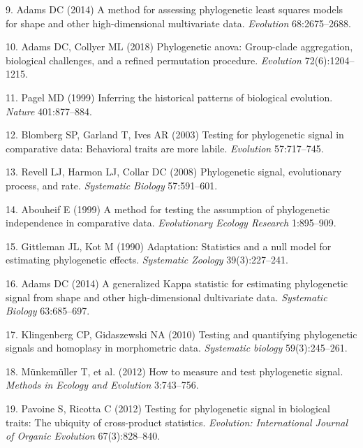 \documentclass[9pt,twocolumn,twoside,lineno]{pnas-new}
\begin{document}
\leavevmode\hypertarget{ref-Adams2014b}{}%
9. Adams DC (2014) A method for assessing phylogenetic least squares
models for shape and other high-dimensional multivariate data.
\emph{Evolution} 68:2675--2688.

\leavevmode\hypertarget{ref-AdamsCollyer2018b}{}%
10. Adams DC, Collyer ML (2018) Phylogenetic anova: Group-clade
aggregation, biological challenges, and a refined permutation procedure.
\emph{Evolution} 72(6):1204--1215.

\leavevmode\hypertarget{ref-Pagel1999}{}%
11. Pagel MD (1999) Inferring the historical patterns of biological
evolution. \emph{Nature} 401:877--884.

\leavevmode\hypertarget{ref-Blomberg_et_al2003}{}%
12. Blomberg SP, Garland T, Ives AR (2003) Testing for phylogenetic
signal in comparative data: Behavioral traits are more labile.
\emph{Evolution} 57:717--745.

\leavevmode\hypertarget{ref-Revell_et_al2008}{}%
13. Revell LJ, Harmon LJ, Collar DC (2008) Phylogenetic signal,
evolutionary process, and rate. \emph{Systematic Biology} 57:591--601.

\leavevmode\hypertarget{ref-Abouheif1999}{}%
14. Abouheif E (1999) A method for testing the assumption of
phylogenetic independence in comparative data. \emph{Evolutionary
Ecology Research} 1:895--909.

\leavevmode\hypertarget{ref-Gittleman1990}{}%
15. Gittleman JL, Kot M (1990) Adaptation: Statistics and a null model
for estimating phylogenetic effects. \emph{Systematic Zoology}
39(3):227--241.

\leavevmode\hypertarget{ref-Adams2014a}{}%
16. Adams DC (2014) A generalized Kappa statistic for estimating
phylogenetic signal from shape and other high-dimensional dultivariate
data. \emph{Systematic Biology} 63:685--697.

\leavevmode\hypertarget{ref-Klingenberg2010}{}%
17. Klingenberg CP, Gidaszewski NA (2010) Testing and quantifying
phylogenetic signals and homoplasy in morphometric data.
\emph{Systematic biology} 59(3):245--261.

\leavevmode\hypertarget{ref-Munkemuller_et_al2012}{}%
18. Münkemüller T, et al. (2012) How to measure and test phylogenetic
signal. \emph{Methods in Ecology and Evolution} 3:743--756.

\leavevmode\hypertarget{ref-Pavoine2012}{}%
19. Pavoine S, Ricotta C (2012) Testing for phylogenetic signal in
biological traits: The ubiquity of cross-product statistics.
\emph{Evolution: International Journal of Organic Evolution}
67(3):828--840.
\end{document}
